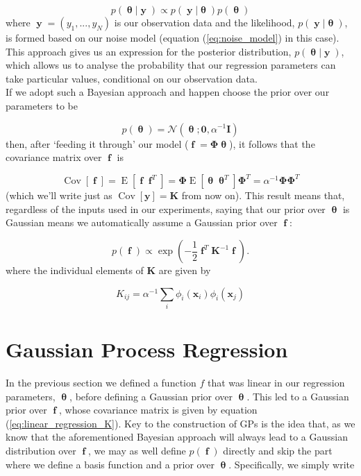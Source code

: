 \documentclass[a4paper, 11pt]{article}
\DeclareMathOperator{\Cov}{Cov}
\DeclareMathOperator{\E}{E}
\DeclareMathOperator{\f}{\boldsymbol{f}}
\DeclareMathOperator{\y}{\boldsymbol{y}}
\DeclareMathOperator{\pa}{\boldsymbol{\theta}}
\begin{document}
\begin{equation}
	p(\pa|\y) \propto p(\y|\pa)p(\pa)
\end{equation}
where $\y=(y_1,...,y_N)$ is our observation data and the likelihood, $p(\y|\pa)$, is formed based on our noise model (equation (\ref{eq:noise_model}) in this case). This approach gives us an expression for the posterior distribution, $p(\pa|\y)$, which allows us to analyse the probability that our regression parameters can take particular values, conditional on our observation data.\\

If we adopt such a Bayesian approach and happen choose the prior over our parameters to be

\begin{equation}
	p(\pa) = \mathcal{N}(\pa; \boldsymbol{0}, \alpha^{-1}\boldsymbol{I})
\end{equation}
then, after `feeding it through' our model ($\f=\boldsymbol{\Phi}\pa$), it follows that the covariance matrix over $\f$ is

\begin{equation}
	\Cov[\f] = \E[\f\f^T] = \boldsymbol{\Phi}\E[\pa\pa^T]\boldsymbol{\Phi}^T = \alpha^{-1}\boldsymbol{\Phi}\boldsymbol{\Phi}^T
\end{equation}
(which we'll write just as $\Cov[\boldsymbol{y}] = \boldsymbol{K}$ from now on). This result means that, regardless of the inputs used in our experiments, saying that our prior over $\pa$ is Gaussian means we automatically assume a Gaussian prior over $\f$:

\begin{equation}
	p(\f) \propto \exp\left( -\frac{1}{2} \f^T\boldsymbol{K}^{-1}\f \right).
\end{equation}
where the individual elements of $\boldsymbol{K}$ are given by

\begin{equation}
	K_{ij} = \alpha^{-1} \sum_i \phi_i(\boldsymbol{x}_i) \phi_i(\boldsymbol{x}_j) 
	\label{eq:linear_regression_K}
\end{equation}	
	
\section{Gaussian Process Regression}
In the previous section we defined a function $f$ that was linear in our regression parameters, $\pa$, before defining a Gaussian prior over $\pa$. This led to a Gaussian prior over $\f$, whose covariance matrix is given by equation (\ref{eq:linear_regression_K}). Key to the construction of GPs is the idea that, as we know that the aforementioned Bayesian approach will always lead to a Gaussian distribution over $\f$, we  may as well define $p(\f)$ directly and skip the part where we define a basis function and a prior over $\pa$. Specifically, we simply write
\end{document}
